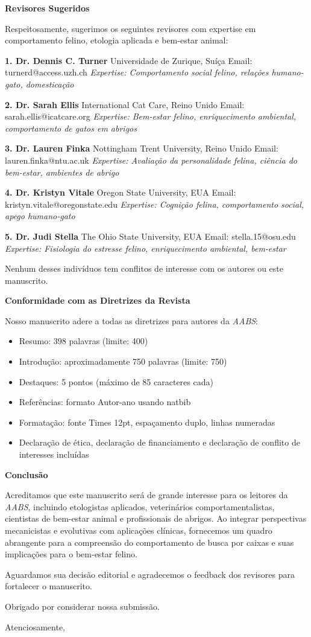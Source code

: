 \documentclass[11pt]{letter}
\begin{document}
\begin{letter}
\textbf{Revisores Sugeridos}

Respeitosamente, sugerimos os seguintes revisores com expertise em comportamento felino, etologia aplicada e bem-estar animal:

\textbf{1. Dr. Dennis C. Turner}  
Universidade de Zurique, Suíça  
Email: turnerd@access.uzh.ch  
\textit{Expertise: Comportamento social felino, relações humano-gato, domesticação}

\textbf{2. Dr. Sarah Ellis}  
International Cat Care, Reino Unido  
Email: sarah.ellis@icatcare.org  
\textit{Expertise: Bem-estar felino, enriquecimento ambiental, comportamento de gatos em abrigos}

\textbf{3. Dr. Lauren Finka}  
Nottingham Trent University, Reino Unido  
Email: lauren.finka@ntu.ac.uk  
\textit{Expertise: Avaliação da personalidade felina, ciência do bem-estar, ambientes de abrigo}

\textbf{4. Dr. Kristyn Vitale}  
Oregon State University, EUA  
Email: kristyn.vitale@oregonstate.edu  
\textit{Expertise: Cognição felina, comportamento social, apego humano-gato}

\textbf{5. Dr. Judi Stella}  
The Ohio State University, EUA  
Email: stella.15@osu.edu  
\textit{Expertise: Fisiologia do estresse felino, enriquecimento ambiental, bem-estar}

Nenhum desses indivíduos tem conflitos de interesse com os autores ou este manuscrito.

\textbf{Conformidade com as Diretrizes da Revista}

Nosso manuscrito adere a todas as diretrizes para autores da \textit{AABS}:

\begin{itemize}
    \item Resumo: 398 palavras (limite: 400)
    \item Introdução: aproximadamente 750 palavras (limite: 750)
    \item Destaques: 5 pontos (máximo de 85 caracteres cada)
    \item Referências: formato Autor-ano usando natbib
    \item Formatação: fonte Times 12pt, espaçamento duplo, linhas numeradas
    \item Declaração de ética, declaração de financiamento e declaração de conflito de interesses incluídas
\end{itemize}

\textbf{Conclusão}

Acreditamos que este manuscrito será de grande interesse para os leitores da \textit{AABS}, incluindo etologistas aplicados, veterinários comportamentalistas, cientistas de bem-estar animal e profissionais de abrigos. Ao integrar perspectivas mecanicistas e evolutivas com aplicações clínicas, fornecemos um quadro abrangente para a compreensão do comportamento de busca por caixas e suas implicações para o bem-estar felino.

Aguardamos sua decisão editorial e agradecemos o feedback dos revisores para fortalecer o manuscrito.

Obrigado por considerar nossa submissão.

\closing{Atenciosamente,}

\end{letter}
\end{document}
